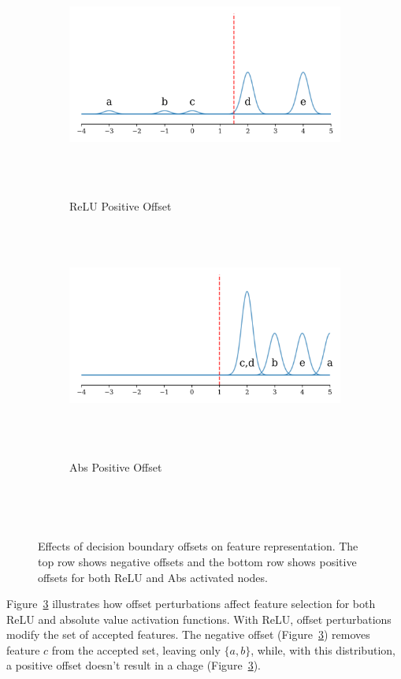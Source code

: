 \begin{figure}[ht]
    \begin{subfigure}[b]{0.49\textwidth}
        \centering
        \includegraphics[width=\textwidth]{images/offset_relu_pos}
        \caption{ReLU Positive Offset}
        \label{fig:relu_offset_up}
    \end{subfigure}
    \hfill
    \begin{subfigure}[b]{0.49\textwidth}
        \centering
        \includegraphics[width=\textwidth]{images/offset_abs_pos}
        \caption{Abs Positive Offset}
        \label{fig:abs_offset_up}
    \end{subfigure}

    \caption{Effects of decision boundary offsets on feature representation. The top row shows negative offsets and the bottom row shows positive offsets for both ReLU and Abs activated nodes.}
    \label{fig:offset_demo}
\end{figure}

Figure~\ref{fig:offset_demo} illustrates how offset perturbations affect feature selection for both ReLU and absolute value activation functions. With ReLU, offset perturbations modify the set of accepted features. The negative offset (Figure~\ref{fig:offset_demo}) removes feature $c$ from the accepted set, leaving only $\{a, b\}$, while, with this distribution, a positive offset doesn't result in a chage (Figure~\ref{fig:offset_demo}). 

